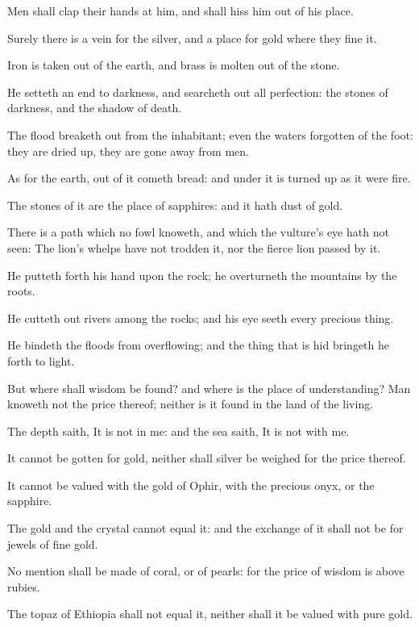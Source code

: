 \Verse Men shall clap their hands at him, and shall hiss him out of his place.


\Chapter
\Verse Surely there is a vein for the silver, and a place for gold where they fine it.

\Verse Iron is taken out of the earth, and brass is molten out of the stone.

\Verse He setteth an end to darkness, and searcheth out all perfection: the stones of darkness, and the shadow of death.

\Verse The flood breaketh out from the inhabitant; even the waters forgotten of the foot: they are dried up, they are gone away from men.

\Verse As for the earth, out of it cometh bread: and under it is turned up as it were fire.

\Verse The stones of it are the place of sapphires: and it hath dust of gold.

\Verse There is a path which no fowl knoweth, and which the vulture's eye hath not seen: \Verse The lion's whelps have not trodden it, nor the fierce lion passed by it.

\Verse He putteth forth his hand upon the rock; he overturneth the mountains by the roots.

\Verse He cutteth out rivers among the rocks; and his eye seeth every precious thing.

\Verse He bindeth the floods from overflowing; and the thing that is hid bringeth he forth to light.

\Verse But where shall wisdom be found? and where is the place of understanding?  \Verse Man knoweth not the price thereof; neither is it found in the land of the living.

\Verse The depth saith, It is not in me: and the sea saith, It is not with me.

\Verse It cannot be gotten for gold, neither shall silver be weighed for the price thereof.

\Verse It cannot be valued with the gold of Ophir, with the precious onyx, or the sapphire.

\Verse The gold and the crystal cannot equal it: and the exchange of it shall not be for jewels of fine gold.

\Verse No mention shall be made of coral, or of pearls: for the price of wisdom is above rubies.

\Verse The topaz of Ethiopia shall not equal it, neither shall it be valued with pure gold.

